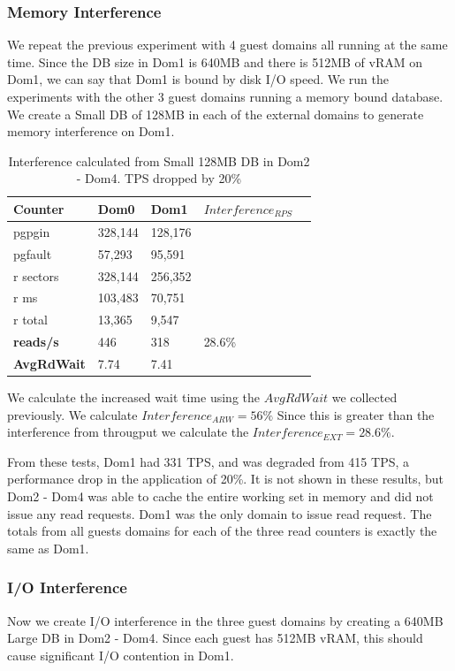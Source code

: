 \subsubsection{Memory Interference}
We repeat the previous experiment with 4 guest domains all running at the same time.  Since the DB size in Dom1 is 640MB and there is 512MB of vRAM on Dom1, we can say that Dom1 is bound by disk I/O speed.  We run the experiments with the other 3 guest domains running a memory bound database.  
We create a Small DB of 128MB in each of the external domains to generate memory interference on Dom1.

\begin{table}[h]
\begin{tabular}{ l l l l p{5cm} }
  Counter & Dom0 & Dom1 & $Interference_{RPS}$ \\
  \hline
	pgpgin    & 328,144 & 128,176 &  \\
	pgfault   &  57,293 &  95,591 &  \\
	r sectors & 328,144 & 256,352 &  \\
	r ms      & 103,483 &  70,751 &  \\
	r total   &  13,365 &   9,547 &  \\
    \textbf{reads/s}    & 446 & 318 & 28.6\%  \\
    \textbf{AvgRdWait}  & 7.74 & 7.41 & \\ 
  \hline
\end{tabular}
\caption{Interference calculated from Small 128MB DB in Dom2 - Dom4.  TPS dropped by 20\%} 
\label{fig:InterferenceSm}
\end{table}
We calculate the increased wait time using the $AvgRdWait$ we collected previously. We calculate $Interference_{ARW} = 56\%$  Since this is greater than the interference from througput we calculate the $Interference_{EXT} = 28.6\%$.

From these tests, Dom1 had 331 TPS, and was degraded from 415 TPS, a performance drop in the application of 20\%.  It is not shown in these results, but Dom2 - Dom4 was able to cache the entire working set in memory and did not issue any read requests.  Dom1 was the only domain to issue read request. The totals from all guests domains for each of the three read counters is exactly the same as Dom1.  

\subsubsection{I/O Interference}
Now we create I/O interference in the three guest domains by creating a 640MB Large DB in Dom2 - Dom4.  Since each guest has 512MB vRAM, this should cause significant I/O contention in Dom1.

